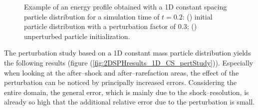 \documentclass[11pt,a4paper,twoside]{report}
\begin{document}
\begin{figure}[!htbp]

\centering
\label{fig:2DSPHresults_perturbationComparisonProfiles}

\caption[Comparison of perturbed and unperturbed energy profiles]{Example of an energy profile obtained with a 1D constant spacing particle distribution for a simulation time of $t=0.2$: () initial particle distribution with a perturbation factor of $0.3$; () unperturbed particle initialization.}

\end{figure}

 The perturbation study based on a 1D constant mass particle distribution yields the following results (figure (\ref{fig:2DSPHresults_1D_CS_pertStudy})). Especially when looking at the after--shock and after--rarefaction areas, the effect of the perturbation can be noticed by principally increased  errors. Considering the entire domain, the general error, which is mainly due to the shock--resolution, is already so high that the additional relative error due to the perturbation is small.
\end{document}

